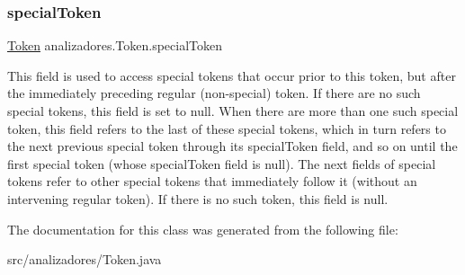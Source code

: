 \subsubsection{\texorpdfstring{special\+Token}{specialToken}}
{\footnotesize\ttfamily \mbox{\hyperlink{classanalizadores_1_1_token}{Token}} analizadores.\+Token.\+special\+Token}

This field is used to access special tokens that occur prior to this token, but after the immediately preceding regular (non-\/special) token. If there are no such special tokens, this field is set to null. When there are more than one such special token, this field refers to the last of these special tokens, which in turn refers to the next previous special token through its special\+Token field, and so on until the first special token (whose special\+Token field is null). The next fields of special tokens refer to other special tokens that immediately follow it (without an intervening regular token). If there is no such token, this field is null. 

The documentation for this class was generated from the following file\+:\begin{DoxyCompactItemize}
\item 
src/analizadores/Token.\+java\end{DoxyCompactItemize}

